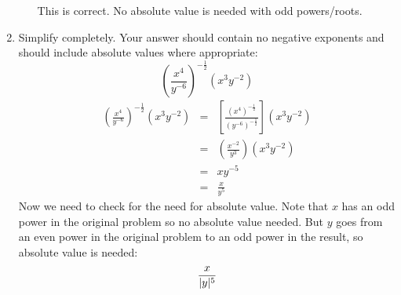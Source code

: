 \documentclass[letterpaper,12pt,fleqn]{article}
\begin{document}
\begin{enumerate}
\begin{enumerate}
  This is correct. No absolute value is needed with odd powers/roots.
\end{enumerate}

\item Simplify completely. Your answer should contain no negative exponents and
  should include absolute values where appropriate:
  \[\left(\frac{x^4}{y^{-6}}\right)^{-\frac{1}{2}}\left(x^3y^{-2}\right)\]
  \begin{eqnarray*}
    \left(\frac{x^4}{y^{-6}}\right)^{-\frac{1}{2}}\left(x^3y^{-2}\right) &=&
    \left[\frac{(x^4)^{-\frac{1}{2}}}{(y^{-6})^{-\frac{1}{2}}}\right]\left(x^3y^{-2}\right) \\
    &=& \left(\frac{x^{-2}}{y^3}\right)\left(x^3y^{-2}\right) \\
    &=& xy^{-5} \\
    &=& \frac{x}{y^5}
  \end{eqnarray*}
  Now we need to check for the need for absolute value. Note that $x$ has an odd power
  in the original problem so no absolute value needed. But $y$ goes from an even power in
  the original problem to an odd power in the result, so absolute value is needed:
  \[\frac{x}{\lvert y\rvert^5}\]
  
\end{enumerate}
\end{document}
